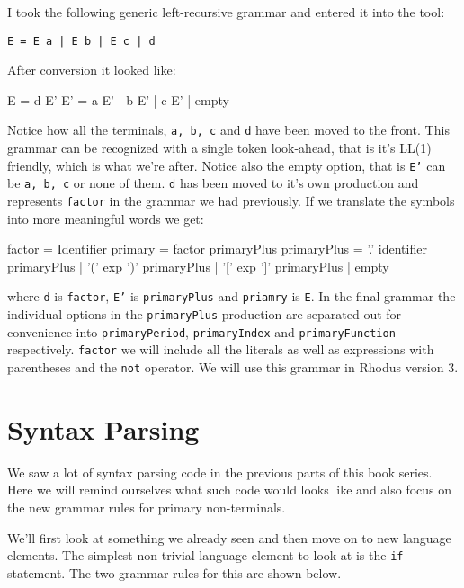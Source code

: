 I took the following generic left-recursive grammar and entered it into the tool:

{\tt  E = E a | E b | E c | d}

After conversion it looked like:
%
\begin{small}
\begin{code}
E   = d E'
E'  = a E'
    | b E'
    | c E'
    | empty
\end{code}
\end{small}
%
Notice how all the terminals, {\tt a, b, c} and {\tt d} have been moved to the front. This grammar can be recognized with a single token look-ahead, that is it's LL(1) friendly, which is what we're after. Notice also the empty option, that is {\tt E'} can be {\tt a, b, c} or none of them. {\tt d} has been moved to it's own production and represents {\tt factor} in the grammar we had previously. If we translate the symbols into more meaningful words we get:
%
\begin{small}
\begin{code}
factor           = Identifier
primary          =  factor primaryPlus
primaryPlus      = '.' identifier primaryPlus
                   | '(' exp ')' primaryPlus
                   | '[' exp ']' primaryPlus
                   | empty
\end{code}
\end{small}
%
where {\tt d} is {\tt factor}, {\tt E'} is {\tt primaryPlus} and {\tt priamry} is {\tt E}.  In the final grammar the individual options in the {\tt primaryPlus} production are separated out for convenience into {\tt primaryPeriod}, {\tt primaryIndex} and {\tt primaryFunction} respectively. {\tt factor} we will include all the literals as well as expressions with parentheses and the {\tt not} operator. We will use this grammar in Rhodus version 3.

\section{Syntax Parsing}

We saw a lot of syntax parsing code in the previous parts of this book series. Here we will remind ourselves what such code would looks like and also focus on the new grammar rules for primary non-terminals.

We'll first look at something we already seen and then move on to new language elements. The simplest non-trivial language element to look at is the {\tt if} statement. The two grammar rules for this are shown below.


